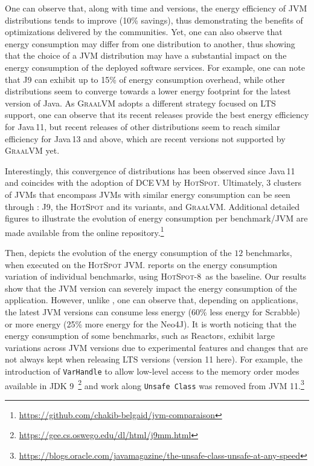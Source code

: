 One can observe that, along with time and versions, the energy efficiency of JVM distributions tends to improve (10\% savings), thus demonstrating the benefits of optimizations delivered by the communities.
Yet, one can also observe that energy consumption may differ from one distribution to another, thus showing that the choice of a JVM distribution may have a substantial impact on the energy consumption of the deployed software services.
For example, one can note that \textsc{J9} can exhibit up to 15\% of energy consumption overhead, while other distributions seem to converge towards a lower energy footprint for the latest version of Java.
As \textsc{GraalVM} adopts a different strategy focused on LTS support, one can observe that its recent releases provide the best energy efficiency for Java\,11, but recent releases of other distributions seem to reach similar efficiency for Java\,13 and above, which are recent versions not supported by \textsc{GraalVM} yet.

Interestingly, this convergence of distributions has been observed since Java\,11 and coincides with the adoption of DCE\,VM by \textsc{HotSpot}.
Ultimately, 3 clusters of JVMs that encompass JVMs with similar energy consumption can be seen through : \textsc{J9}, the \textsc{HotSpot} and its variants, and \textsc{GraalVM}.
Additional detailed figures to illustrate the evolution of energy consumption per benchmark/JVM are made available from the online repository.\footnote{\url{https://github.com/chakib-belgaid/jvm-comparaison}}

Then,  depicts the evolution of the energy consumption of the $12$ benchmarks, when executed on the \textsc{HotSpot} JVM.
 reports on the energy consumption variation of individual benchmarks, using \textsc{HotSpot-8}\ as the baseline.
Our results show that the JVM version can severely impact the energy consumption of the application.
However, unlike , one can observe that, depending on applications, the latest JVM versions can consume less energy (60\% less energy for \textsf{Scrabble}) or more energy (25\% more energy for the \textsf{Neo4J}).
It is worth noticing that the energy consumption of some benchmarks, such as \textsf{Reactors}, exhibit large variations across JVM versions due to experimental features and changes that are not always kept when releasing LTS versions (version 11 here).
For example, the introduction of \texttt{VarHandle} to allow low-level access to the memory order modes available in JDK 9~\footnote{\url{https://gee.cs.oswego.edu/dl/html/j9mm.html}} and work along \texttt{Unsafe Class} was removed from JVM 11.\footnote{\url{https://blogs.oracle.com/javamagazine/the-unsafe-class-unsafe-at-any-speed}}

